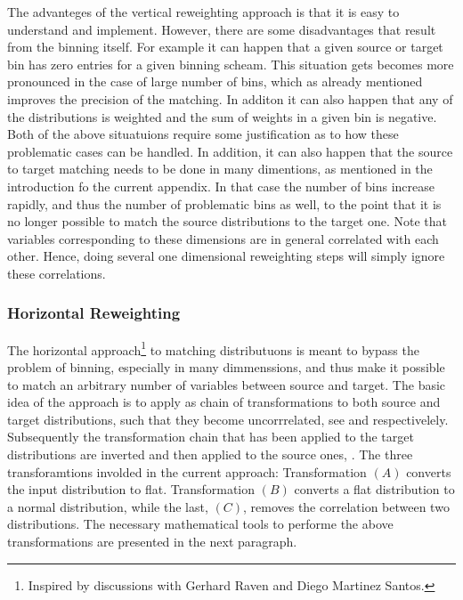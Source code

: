 The advanteges of the vertical reweighting approach is that it is easy to understand and implement.
However, there are some disadvantages that result from the binning itself. For example it can happen
that a given source or target bin has zero entries for a given binning scheam. This situation gets
becomes more pronounced in the case of large number of bins, which as already mentioned improves the
precision of the matching. In additon it can also happen that any of the distributions is weighted and
the sum of weights in a given bin is negative. Both of the above situatuions require some justification
as to how these problematic cases can be handled. In addition, it can also happen that the source to
target matching needs to be done in many dimentions, as mentioned in the introduction fo the current
appendix. In that case the number of bins increase rapidly, and thus the number of problematic bins as well,
to the point that it is no longer possible to match the source distributions to the target one.
Note that variables corresponding to these dimensions are in general correlated with each other.
Hence, doing several one dimensional reweighting steps will simply ignore these correlations.

\subsubsection{Horizontal Reweighting}
The horizontal approach\footnote{Inspired by discussions with Gerhard Raven and Diego Martinez Santos.}
to matching distributuons is meant to bypass the problem of binning, especially in many dimmenssions,
and thus make it possible to match an arbitrary number of variables between source
and target. The basic idea of the approach is to apply as chain of transformations to both source and target
distributions, such that they become uncorrrelated, see  and 
respectivelely. Subsequently the transformation chain that has been applied to the target distributions
are inverted and then applied to the source ones, . The three transforamtions
involded in the current approach: Transformation $(A)$ converts the input distribution to flat.
Transformation $(B)$ converts a flat distribution to a normal distribution, while the last, $(C)$, removes
the correlation between two distributions. The necessary mathematical tools to performe the above transformations
are presented in the next paragraph.


